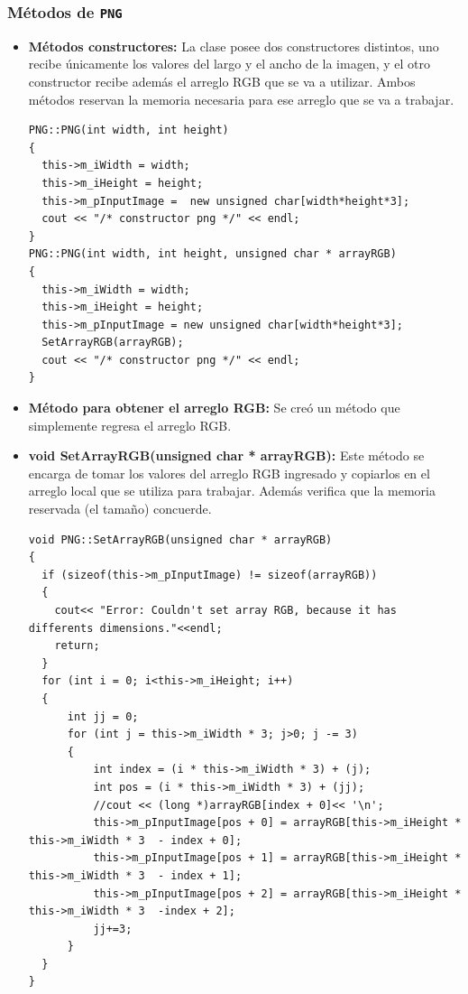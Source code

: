 \subsubsection{Métodos de \texttt{PNG}}
\begin{itemize}
    \item \textbf{Métodos constructores:} La clase posee dos constructores distintos, uno recibe únicamente los valores del largo y el ancho de la imagen, y el otro constructor recibe además el arreglo RGB que se va a utilizar. Ambos métodos reservan la memoria necesaria para ese arreglo que se va a trabajar.
    
    \begin{verbatim}
PNG::PNG(int width, int height)
{
  this->m_iWidth = width;
  this->m_iHeight = height;
  this->m_pInputImage =  new unsigned char[width*height*3];
  cout << "/* constructor png */" << endl;
}
PNG::PNG(int width, int height, unsigned char * arrayRGB)
{
  this->m_iWidth = width;
  this->m_iHeight = height;
  this->m_pInputImage = new unsigned char[width*height*3];
  SetArrayRGB(arrayRGB);
  cout << "/* constructor png */" << endl;
}
    \end{verbatim}

    \item \textbf{Método para obtener el arreglo RGB:} Se creó un método que simplemente regresa el arreglo RGB.
    
    \item \textbf{void SetArrayRGB(unsigned char * arrayRGB):} Este método se encarga de tomar los valores del arreglo RGB ingresado y copiarlos en el arreglo local que se utiliza para trabajar. Además verifica que la memoria reservada (el tamaño) concuerde.
    
    \begin{verbatim}
void PNG::SetArrayRGB(unsigned char * arrayRGB)
{
  if (sizeof(this->m_pInputImage) != sizeof(arrayRGB))
  {
    cout<< "Error: Couldn't set array RGB, because it has differents dimensions."<<endl;
    return;
  }
  for (int i = 0; i<this->m_iHeight; i++)
  {
      int jj = 0;
      for (int j = this->m_iWidth * 3; j>0; j -= 3)
      {
          int index = (i * this->m_iWidth * 3) + (j);
          int pos = (i * this->m_iWidth * 3) + (jj);
          //cout << (long *)arrayRGB[index + 0]<< '\n';
          this->m_pInputImage[pos + 0] = arrayRGB[this->m_iHeight * this->m_iWidth * 3  - index + 0];
          this->m_pInputImage[pos + 1] = arrayRGB[this->m_iHeight * this->m_iWidth * 3  - index + 1];
          this->m_pInputImage[pos + 2] = arrayRGB[this->m_iHeight * this->m_iWidth * 3  -index + 2];
          jj+=3;
      }
  }
}
    \end{verbatim}
    

\end{itemize}
